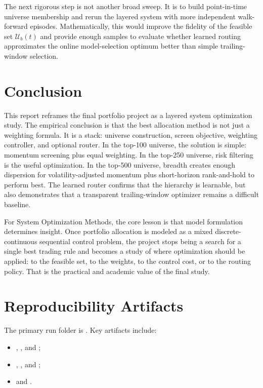 \documentclass[11pt,a4paper]{article}
\begin{document}
The next rigorous step is not another broad sweep. It is to build point-in-time universe membership and rerun the layered system with more independent walk-forward episodes. Mathematically, this would improve the fidelity of the feasible set $\mathcal{U}_b(t)$ and provide enough samples to evaluate whether learned routing approximates the online model-selection optimum better than simple trailing-window selection.

\section{Conclusion}
This report reframes the final portfolio project as a layered system optimization study. The empirical conclusion is that the best allocation method is not just a weighting formula. It is a stack: universe construction, screen objective, weighting controller, and optional router. In the top-100 universe, the solution is simple: momentum screening plus equal weighting. In the top-250 universe, risk filtering is the useful optimization. In the top-500 universe, breadth creates enough dispersion for volatility-adjusted momentum plus short-horizon rank-and-hold to perform best. The learned router confirms that the hierarchy is learnable, but also demonstrates that a transparent trailing-window optimizer remains a difficult baseline.

For System Optimization Methods, the core lesson is that model formulation determines insight. Once portfolio allocation is modeled as a mixed discrete-continuous sequential control problem, the project stops being a search for a single best trading rule and becomes a study of where optimization should be applied: to the feasible set, to the weights, to the control cost, or to the routing policy. That is the practical and academic value of the final study.

\appendix
\section{Reproducibility Artifacts}
The primary run folder is . Key artifacts include:
\begin{itemize}[leftmargin=1.5em,noitemsep]
    \item {}, , and ;
    \item {}, , and ;
    \item {} and .
\end{itemize}
\end{document}
